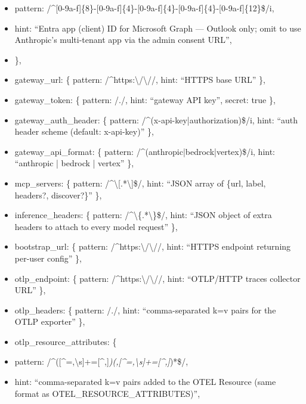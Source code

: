 \documentclass[11pt]{article}
\begin{document}
\begin{itemize}[leftmargin=*,itemsep=2pt,topsep=2pt]
\item {} pattern: /\textasciicircum{}[0-9a-f]\{8\}-[0-9a-f]\{4\}-[0-9a-f]\{4\}-[0-9a-f]\{4\}-[0-9a-f]\{12\}\$/i,
\item {} hint: ``Entra app (client) ID for Microsoft Graph — Outlook only; omit to use Anthropic's multi-tenant app via the admin consent URL'',
\item {} \},
\item {} gateway\_\allowbreak{}url: \{ pattern: /\textasciicircum{}https:\textbackslash{}/\textbackslash{}//, hint: ``HTTPS base URL'' \},
\item {} gateway\_\allowbreak{}token: \{ pattern: /./, hint: ``gateway API key'', secret: true \},
\item {} gateway\_\allowbreak{}auth\_\allowbreak{}header: \{ pattern: /\textasciicircum{}(x-api-key|authorization)\$/i, hint: ``auth header scheme (default: x-api-key)'' \},
\item {} gateway\_\allowbreak{}api\_\allowbreak{}format: \{ pattern: /\textasciicircum{}(anthropic|bedrock|vertex)\$/i, hint: ``anthropic | bedrock | vertex'' \},
\item {} mcp\_\allowbreak{}servers: \{ pattern: /\textasciicircum{}\textbackslash{}[.*\textbackslash{}]\$/, hint: ``JSON array of \{url, label, headers?, discover?\}'' \},
\item {} inference\_\allowbreak{}headers: \{ pattern: /\textasciicircum{}\textbackslash{}\{.*\textbackslash{}\}\$/, hint: ``JSON object of extra headers to attach to every model request'' \},
\item {} bootstrap\_\allowbreak{}url: \{ pattern: /\textasciicircum{}https:\textbackslash{}/\textbackslash{}//, hint: ``HTTPS endpoint returning per-user config'' \},
\item {} otlp\_\allowbreak{}endpoint: \{ pattern: /\textasciicircum{}https:\textbackslash{}/\textbackslash{}//, hint: ``OTLP/HTTP traces collector URL'' \},
\item {} otlp\_\allowbreak{}headers: \{ pattern: /./, hint: ``comma-separated k=v pairs for the OTLP exporter'' \},
\item {} otlp\_\allowbreak{}resource\_\allowbreak{}attributes: \{
\item {} pattern: /\textasciicircum{}([\textasciicircum{}=,\textbackslash{}s]+=[\textasciicircum{},]\emph{)(,[\textasciicircum{}=,\textbackslash{}s]+=[\textasciicircum{},]})*\$/,
\item {} hint: ``comma-separated k=v pairs added to the OTEL Resource (same format as OTEL\_\allowbreak{}RESOURCE\_\allowbreak{}ATTRIBUTES)'',

\end{itemize}
\end{document}
